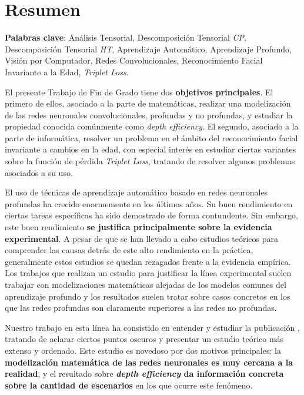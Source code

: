 %



\chapter{Resumen}

\textbf{Palabras clave}: Análisis Tensorial, Descomposición Tensorial \textit{CP}, Descomposición Tensorial \textit{HT}, Aprendizaje Automático, Aprendizaje Profundo, Visión por Computador, Redes Convolucionales, Reconocimiento Facial Invariante a la Edad, \textit{Triplet Loss}.

El presente Trabajo de Fin de Grado tiene dos \textbf{objetivos principales}. El primero de ellos, asociado a la parte de matemáticas, realizar una modelización de las redes neuronales convolucionales, profundas y no profundas, y estudiar la propiedad conocida comúnmente como \textit{depth efficiency}. El segundo, asociado a la parte de informática, resolver un problema en el ámbito del reconocimiento facial invariante a cambios en la edad, con especial interés en estudiar ciertas variantes sobre la función de pérdida \textit{Triplet Loss}, tratando de resolver algunos problemas asociados a su uso.

El uso de técnicas de aprendizaje automático basado en redes neuronales profundas ha crecido enormemente en los últimos años. Su buen rendimiento en ciertas tareas específicas ha sido demostrado de forma contundente. Sin embargo, este buen rendimiento \textbf{se justifica principalmente sobre la evidencia experimental}. A pesar de que se han llevado a cabo estudios teóricos para comprender las causas detrás de este alto rendimiento en la práctica, generalmente estos estudios se quedan rezagados frente a la evidencia empírica. Los trabajos que realizan un estudio para justificar la línea experimental suelen trabajar con modelizaciones matemáticas alejadas de los modelos comunes del aprendizaje profundo y los resultados suelen tratar sobre casos concretos en los que las redes profundas son claramente superiores a las redes no profundas.

Nuestro trabajo en esta línea ha consistido en entender y estudiar la publicación \cite{matematicas:principal}, tratando de aclarar ciertos puntos oscuros y presentar un estudio teórico más extenso y ordenado. Este estudio es novedoso por dos motivos principales: la \textbf{modelización matemática de las redes neuronales es muy cercana a la realidad}, y el resultado sobre \textbf{\textit{depth efficiency} da información concreta sobre la cantidad de escenarios} en los que ocurre este fenómeno.

